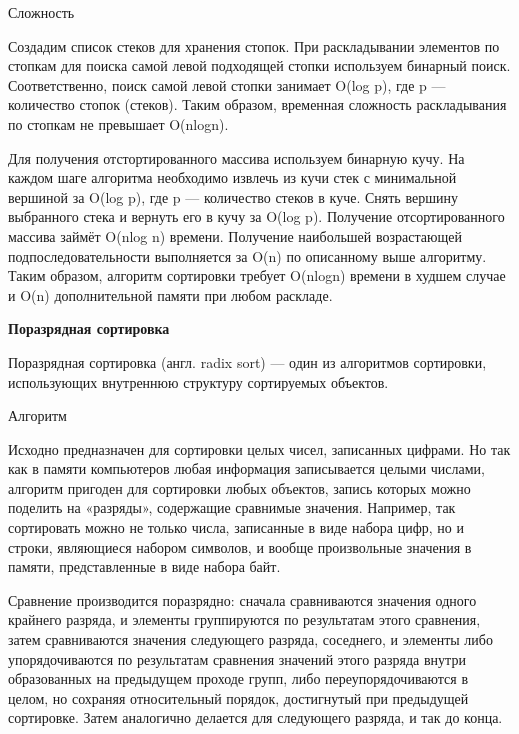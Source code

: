 \documentclass[a4paper, 14pt]{article}
\begin{document}
\begin{doublespace}
\large
Сложность
\normalsize
\end{doublespace}

Создадим список стеков для хранения стопок. При раскладывании элементов по стопкам для поиска самой левой подходящей стопки используем бинарный поиск. Соответственно, поиск самой левой стопки занимает O(log p), где p — количество стопок (стеков). Таким образом, временная сложность раскладывания по стопкам не превышает O(nlogn).

Для получения отстортированного массива используем бинарную кучу. На каждом шаге алгоритма необходимо извлечь из кучи стек с минимальной вершиной за O(log p), где p — количество стеков в куче. Снять вершину выбранного стека и вернуть его в кучу за O(log p). Получение отсортированного массива займёт O(nlog n) времени. Получение наибольшей возрастающей подпоследовательности выполняется за O(n) по описанному выше алгоритму. Таким образом, алгоритм сортировки требует O(nlogn) времени в худшем случае и O(n) дополнительной памяти при любом раскладе.

\begin{doublespace}
\large
\textbf{Поразрядная сортировка}
\normalsize
\end{doublespace}

Поразрядная сортировка (англ. radix sort) — один из алгоритмов сортировки, использующих внутреннюю структуру сортируемых объектов.

\begin{doublespace}
\large
Алгоритм
\normalsize
\end{doublespace}

Исходно предназначен для сортировки целых чисел, записанных цифрами. Но так как в памяти компьютеров любая информация записывается целыми числами, алгоритм пригоден для сортировки любых объектов, запись которых можно поделить на «разряды», содержащие сравнимые значения. Например, так сортировать можно не только числа, записанные в виде набора цифр, но и строки, являющиеся набором символов, и вообще произвольные значения в памяти, представленные в виде набора байт.

Сравнение производится поразрядно: сначала сравниваются значения одного крайнего разряда, и элементы группируются по результатам этого сравнения, затем сравниваются значения следующего разряда, соседнего, и элементы либо упорядочиваются по результатам сравнения значений этого разряда внутри образованных на предыдущем проходе групп, либо переупорядочиваются в целом, но сохраняя относительный порядок, достигнутый при предыдущей сортировке. Затем аналогично делается для следующего разряда, и так до конца.
\end{document}
